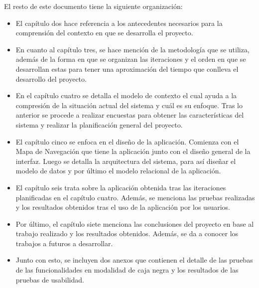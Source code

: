 El resto de este documento tiene la siguiente organización:

\begin{itemize}
    \item El capítulo dos hace referencia a los antecedentes necesarios para la comprensión del contexto en que se desarrolla el proyecto.
    \item En cuanto al capítulo tres, se hace mención de la metodología que se utiliza, además de la forma en que se organizan las iteraciones y el orden en que se desarrollan estas para tener una aproximación del tiempo que conlleva el desarrollo del proyecto.
    \item En el capítulo cuatro se detalla el modelo de contexto el cual ayuda a la compresión de la situación actual del sistema y cuál es su enfoque. Tras lo anterior se procede a realizar encuestas para obtener las características del sistema y realizar la planificación general del proyecto.
    \item El capítulo cinco se enfoca en el diseño de la aplicación. Comienza con el Mapa de Navegación que tiene la aplicación junto con el diseño general de la interfaz. Luego se detalla la arquitectura del sistema, para así diseñar el modelo de datos y por último el modelo relacional de la aplicación.
    \item El capítulo seis trata sobre la aplicación obtenida tras las iteraciones planificadas en el capítulo cuatro. Además, se menciona las pruebas realizadas y los resultados obtenidos tras el uso de la aplicación por los usuarios.
    \item Por último, el capítulo siete menciona las conclusiones del proyecto en base al trabajo realizado y los resultados obtenidos. Además, se da a conocer los trabajos a futuros a desarrollar.
    \item Junto con esto, se incluyen dos anexos que contienen el detalle de las pruebas de las funcionalidades en modalidad de caja negra y los resultados de las pruebas de usabilidad.
\end{itemize}
